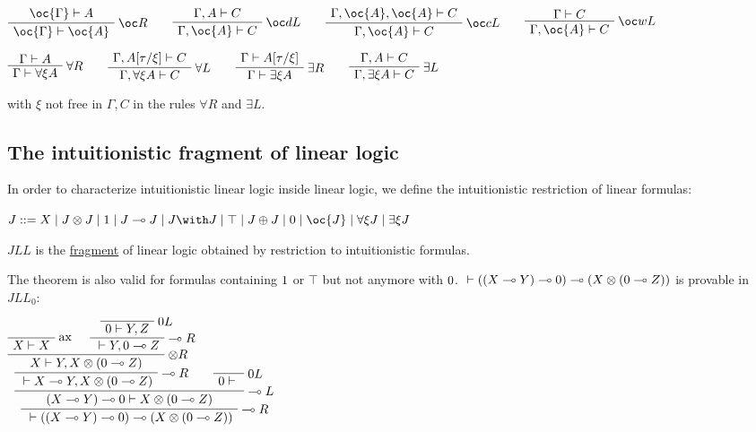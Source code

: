\(\AxRule{\oc{\Gamma}\vdash A}
\LabelRule{\oc R}
\UnaRule{\oc{\Gamma}\vdash\oc{A}}
\DisplayProof
\qquad
\AxRule{\Gamma,A\vdash C}
\LabelRule{\oc d L}
\UnaRule{\Gamma,\oc{A}\vdash C}
\DisplayProof
\qquad
\AxRule{\Gamma,\oc{A},\oc{A}\vdash C}
\LabelRule{\oc c L}
\UnaRule{\Gamma,\oc{A}\vdash C}
\DisplayProof
\qquad
\AxRule{\Gamma\vdash C}
\LabelRule{\oc w L}
\UnaRule{\Gamma,\oc{A}\vdash C}
\DisplayProof\)

\(\AxRule{\Gamma\vdash A}
\LabelRule{\forall R}
\UnaRule{\Gamma\vdash \forall\xi A}
\DisplayProof
\qquad
\AxRule{\Gamma,A[\tau/\xi]\vdash C}
\LabelRule{\forall L}
\UnaRule{\Gamma,\forall\xi A\vdash C}
\DisplayProof
\qquad
\AxRule{\Gamma\vdash A[\tau/\xi]}
\LabelRule{\exists R}
\UnaRule{\Gamma\vdash\exists\xi A}
\DisplayProof
\qquad
\AxRule{\Gamma,A\vdash C}
\LabelRule{\exists L}
\UnaRule{\Gamma,\exists\xi A\vdash C}
\DisplayProof\)

with \(\xi\) not free in \(\Gamma,C\) in the rules \(\forall R\) and
\(\exists L\).

\subsection{The intuitionistic fragment of linear logic}\label{the-intuitionistic-fragment-of-linear-logic}

In order to characterize intuitionistic linear logic inside linear
logic, we define the intuitionistic restriction of linear formulas:

\(J ::= X \mid J\tens J \mid \one \mid J\limp J \mid J\with J \mid \top \mid J\plus J \mid \zero \mid \oc{J} \mid \forall\xi J \mid \exists\xi J\)

\(JLL\) is the \url{fragment} of linear logic obtained by restriction to
intuitionistic formulas.

The theorem is also valid for formulas containing \(1\) or \(\top\)
but not anymore with \(0\).
\({}\vdash((X\multimap Y)\multimap0)\multimap(X\otimes(0\multimap Z))\) is
provable in \(JLL_0\):

\(\LabelRule{\rulename{ax}}
\NulRule{X\vdash X}
\LabelRule{\zero L}
\NulRule{\zero\vdash Y,Z}
\LabelRule{\limp R}
\UnaRule{{}\vdash Y,\zero\limp Z}
\LabelRule{\tens R}
\BinRule{X\vdash Y,X\tens(\zero\limp Z)}
\LabelRule{\limp R}
\UnaRule{{}\vdash X\limp Y,X\tens(\zero\limp Z)}
\LabelRule{\zero L}
\NulRule{\zero\vdash {}}
\LabelRule{\limp L}
\BinRule{(X\limp Y)\limp\zero\vdash X\tens(\zero\limp Z)}
\LabelRule{\limp R}
\UnaRule{{}\vdash((X\limp Y)\limp\zero)\limp(X\tens(\zero\limp Z))}
\DisplayProof\)

